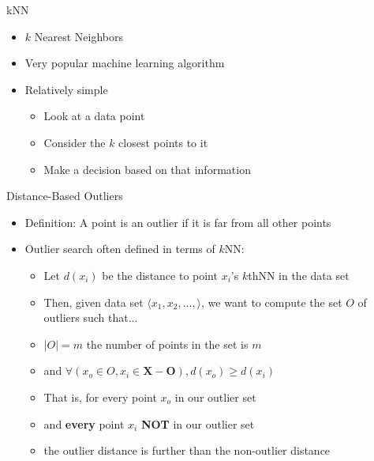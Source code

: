 \documentclass[aspectratio=169]{beamer}
\begin{document}
\begin{frame}{kNN}

\begin{itemize}
\item $k$ Nearest Neighbors
\item Very popular machine learning algorithm
\item Relatively simple
        \begin{itemize}
	\item Look at a data point
	\item Consider the $k$ closest points to it
	\item Make a decision based on that information
\end{itemize}
\end{itemize}
\end{frame}
\begin{frame}{Distance-Based Outliers}

\begin{itemize}
	\item Definition: A point is an outlier if it is far from all other points
	\vspace{1 em}
	\item Outlier search often defined in terms of $k$NN:
	\begin{itemize}
	\item Let $d(x_i)$ be the distance to point $x_i$'s $k$thNN in the data set
	\item Then, given data set $\langle x_1, x_2, ..., \rangle$, 
		we want to compute the set $O$ of outliers such that...
	\item $|O| = m$ the number of points in the set is $m$
	\item and $\forall (x_o \in O, x_i \in \textbf{X} - \textbf{O}), d(x_o) \ge d(x_i)$
	\vspace{1 em}
	\item That is, for every point $x_o$ in our outlier set
	\item and \textbf{every} point $x_i$ \textbf{NOT} in our outlier set
	\item the outlier distance is further than the non-outlier distance 
	\end{itemize}
\end{itemize}

\end{frame}
\end{document}
